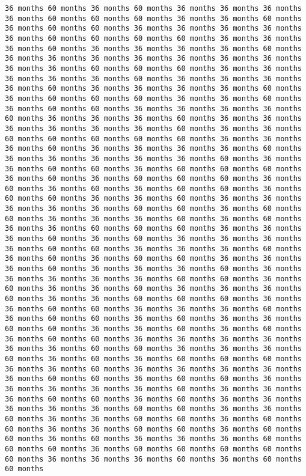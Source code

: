 \documentclass[11pt]{article}
\begin{document}
\begin{Verbatim}[commandchars=\\\{\}, frame=single, framerule=2mm, rulecolor=\color{outerrorbackground}]
36 months 60 months 36 months 60 months 36 months 36 months 36 months 36 months 60 months 60 months 60 months 36 months 36 months 60 months 36 months 60 months 60 months 36 months 36 months 36 months 36 months 36 months 60 months 60 months 60 months 60 months 36 months 36 months 36 months 60 months 36 months 36 months 36 months 36 months 60 months 36 months 36 months 36 months 36 months 36 months 36 months 36 months 36 months 36 months 60 months 60 months 60 months 36 months 36 months 36 months 36 months 36 months 60 months 36 months 36 months 36 months 36 months 60 months 36 months 36 months 36 months 36 months 60 months 36 months 60 months 60 months 60 months 36 months 36 months 60 months 36 months 60 months 60 months 36 months 36 months 36 months 36 months 60 months 36 months 36 months 36 months 60 months 36 months 36 months 36 months 36 months 36 months 36 months 60 months 36 months 36 months 60 months 60 months 60 months 60 months 60 months 36 months 36 months 36 months 60 months 36 months 36 months 36 months 36 months 60 months 36 months 36 months 36 months 36 months 36 months 60 months 36 months 36 months 60 months 60 months 36 months 60 months 60 months 60 months 36 months 60 months 36 months 60 months 60 months 60 months 36 months 60 months 36 months 60 months 36 months 60 months 60 months 36 months 60 months 60 months 36 months 36 months 60 months 36 months 36 months 36 months 36 months 36 months 60 months 60 months 36 months 60 months 60 months 36 months 36 months 36 months 60 months 36 months 60 months 36 months 36 months 60 months 60 months 60 months 36 months 36 months 36 months 60 months 36 months 60 months 36 months 36 months 36 months 36 months 60 months 60 months 36 months 36 months 36 months 60 months 36 months 60 months 36 months 60 months 60 months 36 months 36 months 36 months 60 months 36 months 36 months 36 months 60 months 36 months 36 months 36 months 36 months 36 months 60 months 60 months 36 months 60 months 36 months 36 months 60 months 36 months 36 months 36 months 60 months 36 months 36 months 60 months 60 months 60 months 36 months 36 months 60 months 60 months 36 months 36 months 36 months 60 months 36 months 60 months 60 months 36 months 60 months 36 months 36 months 60 months 60 months 36 months 36 months 60 months 36 months 60 months 36 months 60 months 60 months 36 months 36 months 36 months 36 months 36 months 36 months 60 months 60 months 36 months 36 months 36 months 60 months 36 months 60 months 36 months 60 months 60 months 60 months 36 months 36 months 60 months 36 months 36 months 36 months 36 months 36 months 60 months 60 months 36 months 60 months 60 months 36 months 36 months 36 months 36 months 36 months 60 months 36 months 36 months 36 months 60 months 60 months 36 months 60 months 36 months 36 months 36 months 36 months 36 months 60 months 60 months 36 months 36 months 60 months 36 months 36 months 60 months 60 months 36 months 60 months 60 months 36 months 36 months 60 months 60 months 36 months 60 months 60 months 36 months 60 months 36 months 36 months 36 months 60 months 60 months 60 months 36 months 60 months 60 months 60 months 60 months 60 months 36 months 36 months 36 months 60 months 36 months 60 months 60 months 
\end{Verbatim}
\end{document}
